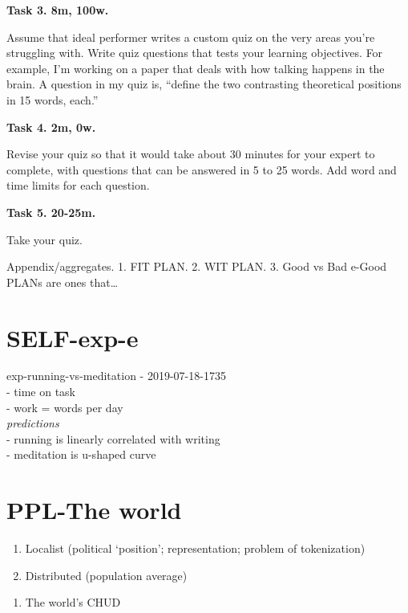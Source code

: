 \documentclass[
]{book}
\providecommand{\tightlist}{%
  \setlength{\itemsep}{0pt}\setlength{\parskip}{0pt}}
\begin{document}
\textbf{Task 3. 8m, 100w.}

Assume that ideal performer writes a custom quiz on
the very areas you're struggling with.
Write quiz questions that tests your learning objectives.
For example, I'm working on a paper that deals with
how talking happens in the brain.
A question in my quiz is, ``define the two contrasting theoretical
positions in 15 words, each.''

\textbf{Task 4. 2m, 0w.}

Revise your quiz so that it would take about 30 minutes for your expert to complete, with questions that can be answered in 5 to 25 words.
Add word and time limits for each question.

\textbf{Task 5. 20-25m.}

Take your quiz.

Appendix/aggregates.
1. FIT PLAN.
2. WIT PLAN.
3. Good vs Bad
e-Good PLANs are ones that\ldots{}

\hypertarget{self-exp-e}{%
\section{SELF-exp-e}\label{self-exp-e}}

exp-running-vs-meditation
- 2019-07-18-1735\\
- time on task\\
- work = words per day\\
\emph{predictions}\\
- running is linearly correlated with writing\\
- meditation is u-shaped curve

\hypertarget{ppl-the-world}{%
\section{PPL-The world}\label{ppl-the-world}}

\begin{enumerate}
\def\labelenumi{\alph{enumi}.}
\tightlist
\item
  Localist (political `position'; representation; problem of tokenization)
\item
  Distributed (population average)
\end{enumerate}

\begin{enumerate}
\def\labelenumi{\arabic{enumi}.}
\setcounter{enumi}{2}
\tightlist
\item
  The world's CHUD
\end{enumerate}

  
\end{document}
